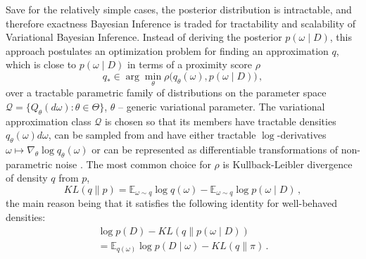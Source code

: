 \documentclass[a4paper,10pt,onecolumn]{article}
\begin{document}
Save for the relatively simple cases, the posterior distribution is intractable, and
therefore exactness Bayesian Inference is traded for tractability and scalability of
Variational Bayesian Inference. Instead of deriving the posterior $p(\omega \mid D)$,
this approach postulates an optimization problem for finding an approximation $q$,
which is close to $p(\omega \mid D)$ in terms of a proximity score $\rho$
\begin{equation}  \label{eq:variational-progam}
  q_*
    \in \arg \min_{\theta} \rho\bigl(
      q_\theta(\omega), p(\omega \mid D)
    \bigr)
    \,,
\end{equation}
over a tractable parametric family of distributions on the parameter space $
  \mathcal{Q} = \{Q_\theta(d\omega) \colon \theta \in \Theta\}
$, $\theta$ -- generic variational parameter. The variational approximation class
$\mathcal{Q}$ is chosen so that its members have tractable densities $
  q_\theta(\omega) d\omega
$, can be sampled from and have either tractable $\log$-derivatives $
  \omega \mapsto \nabla_\theta \log q_\theta(\omega)
$ or can be represented as differentiable transformations of non-parametric noise
\citep{williams_simple_1992,kingma_auto-encoding_2014,figurnov_implicit_2019}.
%
The most common choice for $\rho$ is Kullback-Leibler divergence of density $q$ from $p$,
\begin{equation}  \label{eq:kl-div-def}
  KL(q \| p)
    = \mathbb{E}_{\omega \sim q}
      \log{q(\omega)}
    - \mathbb{E}_{\omega \sim q}
      \log{p(\omega \mid D)}
    \,,
\end{equation}
the main reason being that it satisfies the following identity for well-behaved densities:
\begin{multline}  \label{eq:kl-div-master}
  \log p(D)
    - KL(q \| p(\omega \mid D))
    \\ = \mathbb{E}_{q(\omega)} \log{p(D \mid \omega)}
    - KL(q \| \pi)
    \,.
\end{multline}
\end{document}
